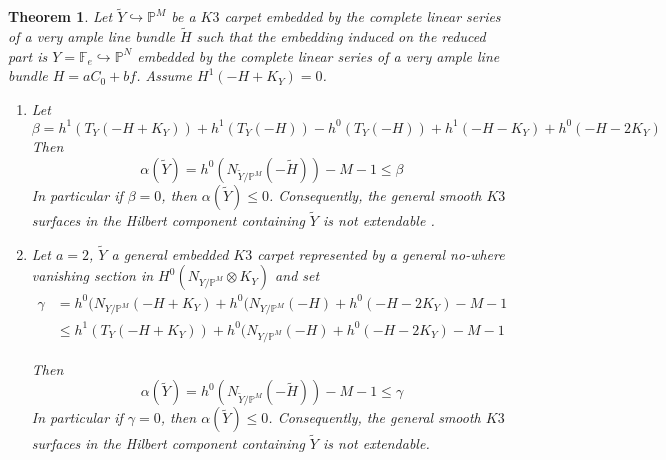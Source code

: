 \documentclass[11pt,twoside]{amsart}
\theoremstyle{plain}
\numberwithin{equation}{section}
\newtheorem{theorem}{Theorem}[section]
\theoremstyle{definition}
\begin{document}
\begin{theorem}\label{ZL for K3 carpets}
 Let $\widetilde{Y} \hookrightarrow \mathbb{P}^M$ be a $K3$ carpet embedded by the complete linear series of a very ample line bundle $\widetilde{H}$ such that the embedding induced on the reduced part is $Y = \mathbb{F}_e \hookrightarrow \mathbb{P}^N$ embedded by the complete linear series of a very ample line bundle $H = aC_0+bf$. Assume $H^1(-H+K_Y) = 0$. 
 
 \begin{enumerate}
 \item Let $$\beta = h^1(T_Y(-H+K_Y)) + h^1(T_Y(-H)) - h^0(T_Y(-H)) +  h^1(-H-K_Y) + h^0(-H-2K_Y)$$ 
Then 
$$\alpha(\widetilde{Y}) = h^0(N_{\widetilde{Y}/\mathbb{P}^M}(-\widetilde{H}))-M-1 \leq  \beta$$ 
In particular if $\beta = 0$, then $\alpha(\widetilde{Y}) \leq 0$. Consequently, the general smooth $K3$ surfaces in the Hilbert component containing $\widetilde{Y}$ is not extendable .

\item Let $a = 2$, $\widetilde{Y}$ a general embedded $K3$ carpet represented by a general no-where vanishing section in $H^0(N_{Y/\mathbb{P}^M} \otimes K_Y)$ and set
\begin{align*}
    \gamma & =  h^0(N_{Y/\mathbb{P}^M}(-H+K_Y)+h^0(N_{Y/\mathbb{P}^M}(-H)+h^0(-H-2K_Y)-M-1 \\
    & \leq h^1(T_Y(-H+K_Y))+h^0(N_{Y/\mathbb{P}^M}(-H)+h^0(-H-2K_Y)-M-1
\end{align*}

Then 
$$\alpha(\widetilde{Y}) = h^0(N_{\widetilde{Y}/\mathbb{P}^M}(-\widetilde{H}))-M-1 \leq  \gamma$$ 
In particular if $\gamma = 0$, then $\alpha(\widetilde{Y}) \leq 0$. Consequently, the general smooth $K3$ surfaces in the Hilbert component containing $\widetilde{Y}$ is not extendable.


\end{enumerate}
\end{theorem}
\end{document}
